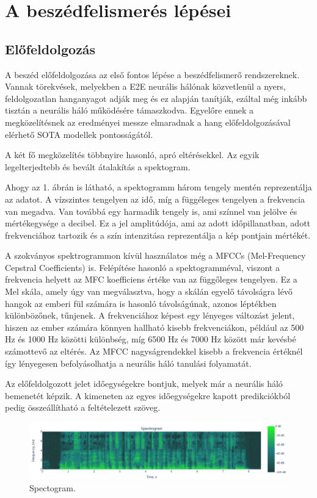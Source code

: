 \section{A beszédfelismerés lépései}

\subsection{Előfeldolgozás}

A beszéd előfeldolgozása az első fontos lépése a beszédfelismerő rendszereknek. Vannak törekvések, melyekben a E2E neurális hálónak közvetlenül a nyers, feldolgozatlan hanganyagot adják meg és ez alapján tanítják\cite{Zeghidour2018}, ezáltal még inkább tisztán a neurális háló működésére támaszkodva. Egyelőre ennek a megközelítésnek az eredményei messze elmaradnak a hang előfeldolgozásával elérhető SOTA modellek pontosságától.

A két fő megközelítés többnyire hasonló, apró eltérésekkel. Az egyik legelterjedtebb és bevált átalakítás a spektogram.

Ahogy az 1. ábrán is látható, a spektogramm három tengely mentén reprezentálja az adatot. A vízszintes tengelyen az idő, míg a függéleges tengelyen a frekvencia van megadva. Van továbbá egy harmadik tengely is, ami színnel van jelölve és mértékegysége a decibel. Ez a jel amplitúdója, ami az adott időpillanatban, adott frekvenciához tartozik és a szín intenzitása reprezentálja a kép pontjain mértékét.

A szokványos spektrogrammon kívül használatos még a MFCCs (Mel-Frequency Cepstral Coefficients) is. Felépítése hasonló a spektogramméval, viszont a frekvencia helyett az MFC koefficiens \cite {mfcc} értéke van az függőleges tengelyen. Ez a Mel skála, amely úgy van megválasztva, hogy a skálán egyelő távolságra lévő hangok az emberi fül számára is hasonló távolságúnak, azonos léptékben különbözőnek, tűnjenek. A frekvenciához képest egy lényeges változást jelent, hiszen az ember számára könnyen hallható kisebb frekvenciákon, például az 500 Hz és 1000 Hz közötti különbség, míg 6500 Hz és 7000 Hz között már kevésbé számottevő az eltérés. Az MFCC nagyságrendekkel kisebb a frekvencia értéknél így lényegesen befolyásolhatja a neurális háló tanulási folyamatát.

Az előfeldolgozott jelet időegységekre bontjuk, melyek már a neurális háló bemenetét képzik. A kimeneten az egyes időegységekre kapott predikciókból pedig összeállítható a feltételezett szöveg.

\begin{figure}[!ht]
\centering
\includegraphics[width=150mm, keepaspectratio]{figures/spectogram.png}
\caption{Spectogram.}
\end{figure}

